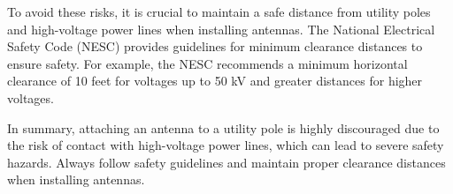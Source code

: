 To avoid these risks, it is crucial to maintain a safe distance from utility poles and high-voltage power lines when installing antennas. The National Electrical Safety Code (NESC) provides guidelines for minimum clearance distances to ensure safety. For example, the NESC recommends a minimum horizontal clearance of 10 feet for voltages up to 50 kV and greater distances for higher voltages.

In summary, attaching an antenna to a utility pole is highly discouraged due to the risk of contact with high-voltage power lines, which can lead to severe safety hazards. Always follow safety guidelines and maintain proper clearance distances when installing antennas.

